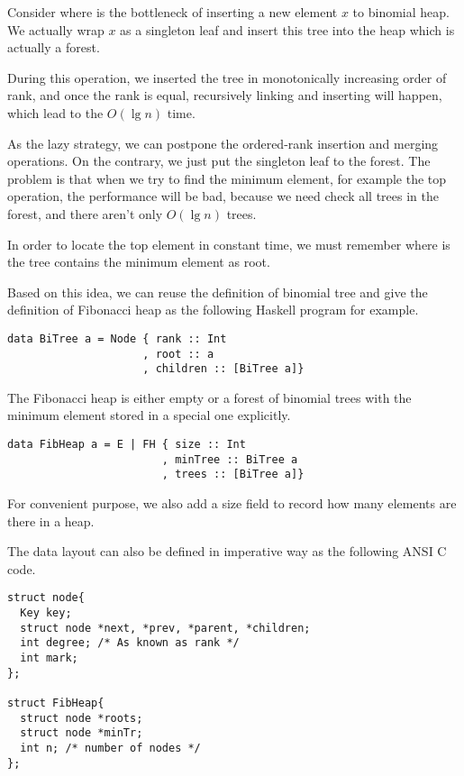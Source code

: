 \documentclass{article}
\begin{document}
Consider where is the bottleneck of inserting a new element $x$ to
binomial heap. We actually wrap $x$ as a singleton leaf and insert
this tree into the heap which is actually a forest.

During this operation, we inserted the tree in
monotonically increasing order of rank, and once the rank is equal,
recursively linking and inserting will happen, which lead to the
$O(\lg n)$ time.

As the lazy strategy, we can postpone the ordered-rank insertion and
merging operations. On the contrary, we just put the singleton
leaf to the forest. The problem is that when we try to find the
minimum element, for example the top operation, the performance
will be bad, because we need check all trees in the forest, and
there aren't only $O(\lg n)$ trees.

In order to locate the top element in constant time, we must remember
where is the tree contains the minimum element as root.

Based on this idea, we can reuse the definition of binomial tree
and give the definition of Fibonacci heap as the following Haskell
program for example.

\lstset{language=Haskell}
\begin{lstlisting}
data BiTree a = Node { rank :: Int
                     , root :: a
                     , children :: [BiTree a]}
\end{lstlisting}

The Fibonacci heap is either empty or a forest of binomial trees with
the minimum element stored in a special one explicitly.

\begin{lstlisting}
data FibHeap a = E | FH { size :: Int
                        , minTree :: BiTree a
                        , trees :: [BiTree a]}
\end{lstlisting}

For convenient purpose, we also add a size field to record how many
elements are there in a heap.

The data layout can also be defined in imperative way as the following
ANSI C code.

\lstset{language=C}
\begin{lstlisting}
struct node{
  Key key;
  struct node *next, *prev, *parent, *children;
  int degree; /* As known as rank */
  int mark;
};

struct FibHeap{
  struct node *roots;
  struct node *minTr;
  int n; /* number of nodes */
};
\end{lstlisting}
\end{document}

